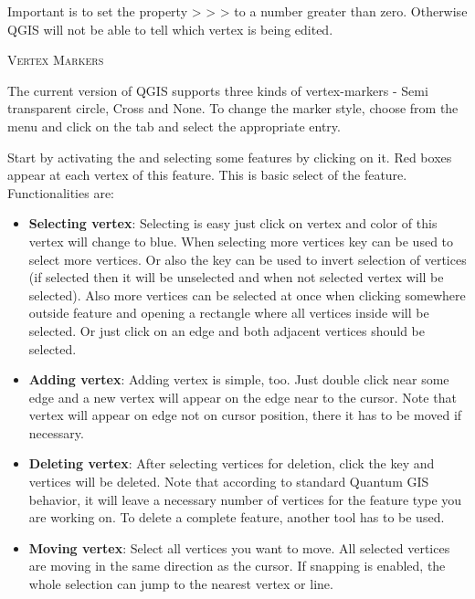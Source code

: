 Important is to set the property  >
 >
> to a number greater than
zero. Otherwise QGIS will not be able to tell which vertex is being edited.

\begin{Tip}[ht]\caption{\textsc{Vertex Markers}}
The current version of QGIS supports three kinds of vertex-markers -
Semi transparent circle, Cross and None. To change the marker style, choose
 from the  menu
and click on the  tab and select the appropriate entry.
\end{Tip}


Start by activating the  and selecting
some features by clicking on it. Red boxes appear at each vertex of this feature.
This is basic select of the feature. Functionalities are:

\begin{itemize}
\item \textbf{Selecting vertex}: Selecting is easy just click on vertex and
color of this vertex will change to blue. When selecting more vertices
 key can be used to select more vertices. Or also the
 key can be used to invert selection of vertices (if selected then
it will be unselected and when not selected vertex will be selected). Also more
vertices can be selected at once when clicking somewhere outside feature and opening a rectangle where all vertices inside will be selected. Or just click on an edge and
both adjacent vertices should be selected.
\item \textbf{Adding vertex}: Adding vertex is simple, too. Just double click near
some edge and a new vertex will appear on the edge near to the cursor. Note that
vertex will appear on edge not on cursor position, there it has to be moved if
necessary.
\item \textbf{Deleting vertex}: After selecting vertices for deletion, click the
 key and vertices will be deleted. Note that according to
standard Quantum GIS behavior, it will leave a necessary number of vertices for
the feature type you are working on. To delete a complete feature, another tool
has to be used.
\item \textbf{Moving vertex}: Select all vertices you want to move. All selected
vertices are moving in the same direction as the cursor. If snapping is enabled,
the whole selection can jump to the nearest vertex or line.
\end{itemize}

